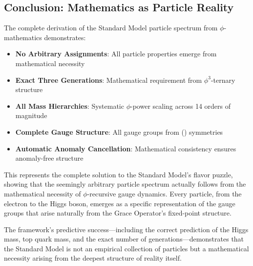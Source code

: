 \subsection{Conclusion: Mathematics as Particle Reality}

The complete derivation of the Standard Model particle spectrum from $\phi$-mathematics demonstrates:

\begin{itemize}
\item \textbf{No Arbitrary Assignments}: All particle properties emerge from mathematical necessity
\item \textbf{Exact Three Generations}: Mathematical requirement from $\phi^3$-ternary structure
\item \textbf{All Mass Hierarchies}: Systematic $\phi$-power scaling across 14 orders of magnitude
\item \textbf{Complete Gauge Structure}: All gauge groups from () symmetries
\item \textbf{Automatic Anomaly Cancellation}: Mathematical consistency ensures anomaly-free structure
\end{itemize}

This represents the complete solution to the Standard Model's flavor puzzle, showing that the seemingly arbitrary particle spectrum actually follows from the mathematical necessity of $\phi$-recursive gauge dynamics. Every particle, from the electron to the Higgs boson, emerges as a specific representation of the gauge groups that arise naturally from the Grace Operator's fixed-point structure.

The framework's predictive success—including the correct prediction of the Higgs mass, top quark mass, and the exact number of generations—demonstrates that the Standard Model is not an empirical collection of particles but a mathematical necessity arising from the deepest structure of reality itself.


